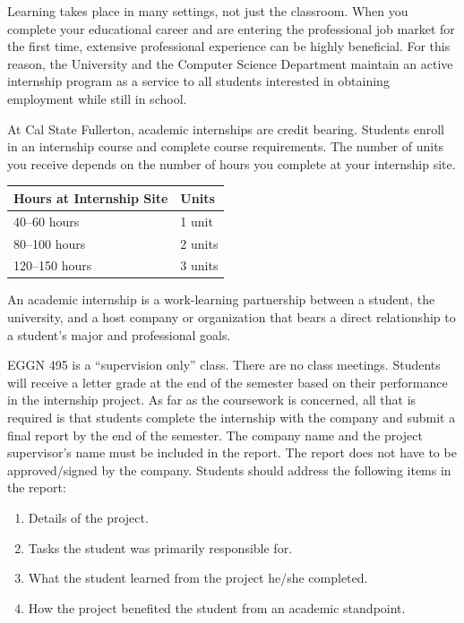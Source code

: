 \documentclass{book}
\begin{document}
Learning takes place in many settings, not just the classroom. When you complete your educational career and are entering the professional job market for the first time, extensive professional experience can be highly beneficial. For this reason, the University and the Computer Science Department maintain an active internship program as a service to all students interested in obtaining employment while still in school.

At Cal State Fullerton, academic internships are credit bearing. Students enroll in an internship course and complete course requirements. The number of units you receive depends on the number of hours you complete at your internship site.

\begin{center}
\begin{tabular}{|l|l|} \hline
  \textbf{Hours at Internship Site} & \textbf{Units} \\ \hline
  40--60 hours & 1 unit \\ \hline
  80--100 hours & 2 units \\ \hline
  120--150 hours & 3 units \\ \hline
\end{tabular}
\end{center}

An academic internship is a work-learning partnership between a student, the university, and a host company or organization that bears a direct relationship to a student’s major and professional goals.

EGGN 495 is a ``supervision only'' class. There are no class meetings. Students will receive a letter grade at the end of the semester based on their performance in the internship project. As far as the coursework is concerned, all that is required is that students complete the internship with the company and submit a final report by the end of the semester. The company name and the project supervisor's name must be included in the report. The report does not have to be approved/signed by the company. Students should address the following items in the report:
\begin{enumerate}
\item Details of the project.
\item Tasks the student was primarily responsible for.
\item What the student learned from the project he/she completed.
\item How the project benefited the student from an academic standpoint.
\end{enumerate}
\end{document}
